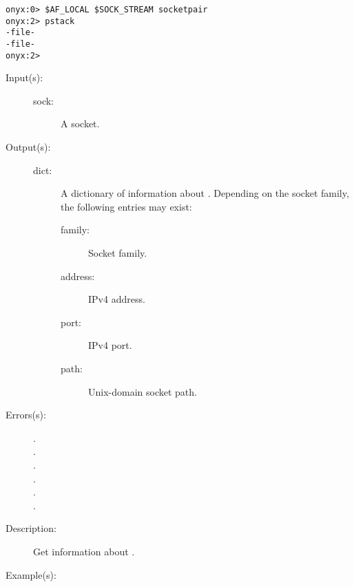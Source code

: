 \begin{description}
\begin{description}
\begin{verbatim}
onyx:0> $AF_LOCAL $SOCK_STREAM socketpair
onyx:2> pstack
-file-
-file-
onyx:2>
		\end{verbatim}
	\end{description}
\label{systemdict:sockname}
\item[{\onyxop{sock}{sockname}{dict}}: ]
	\begin{description}\item[]
	\item[Input(s): ]
		\begin{description}\item[]
		\item[sock: ]
			A socket.
		\end{description}
	\item[Output(s): ]
		\begin{description}\item[]
		\item[dict: ]
			A dictionary of information about .
			Depending on the socket family, the following entries
			may exist:
			\begin{description}%
			\item[family: ] Socket family.
			\item[address: ] IPv4 address.
			\item[port: ] IPv4 port.
			\item[path: ] Unix-domain socket path.
			\end{description}
		\end{description}
	\item[Errors(s): ]
		\begin{description}\item[]
		\item[.]
		\item[.]
		\item[.]
		\item[.]
		\item[.]
		\item[.]
		\end{description}
	\item[Description: ]
		Get information about .
	\item[Example(s): ]\begin{verbatim}


\end{verbatim}
\end{description}
\end{description}
